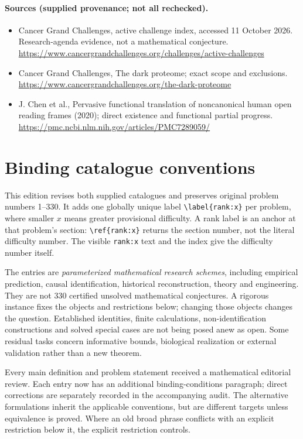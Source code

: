 \documentclass[11pt]{article}
\begin{document}
\paragraph{Sources (supplied provenance; not all rechecked).}
\begin{itemize}
\item Cancer Grand Challenges, active challenge index, accessed 11 October 2026. Research-agenda evidence, not a mathematical conjecture. \url{https://www.cancergrandchallenges.org/challenges/active-challenges}
\item Cancer Grand Challenges, The dark proteome; exact scope and exclusions. \url{https://www.cancergrandchallenges.org/the-dark-proteome}
\item J. Chen et al., Pervasive functional translation of noncanonical human open reading frames (2020); direct existence and functional partial progress. \url{https://pmc.ncbi.nlm.nih.gov/articles/PMC7289059/}
\end{itemize}


\section*{Binding catalogue conventions}
This edition revises both supplied catalogues and preserves original problem numbers 1--330. It adds one globally unique label \verb|\label{rank:x}| per problem, where smaller $x$ means greater provisional difficulty. A rank label is an anchor at that problem's section: \verb|\ref{rank:x}| returns the section number, not the literal difficulty number. The visible \texttt{rank:x} text and the index give the difficulty number itself.

The entries are \emph{parameterized mathematical research schemes}, including empirical prediction, causal identification, historical reconstruction, theory and engineering. They are not 330 certified unsolved mathematical conjectures. A rigorous instance fixes the objects and restrictions below; changing those objects changes the question. Established identities, finite calculations, non-identification constructions and solved special cases are not being posed anew as open. Some residual tasks concern informative bounds, biological realization or external validation rather than a new theorem.

Every main definition and problem statement received a mathematical editorial review. Each entry now has an additional binding-conditions paragraph; direct corrections are separately recorded in the accompanying audit. The alternative formulations inherit the applicable conventions, but are different targets unless equivalence is proved. Where an old broad phrase conflicts with an explicit restriction below it, the explicit restriction controls.
\end{document}
